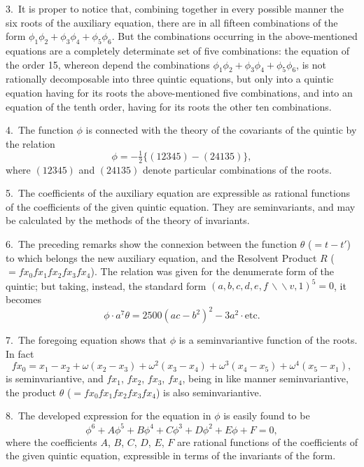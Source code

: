 \documentclass[11pt,a4paper]{article}
\theoremstyle{plain}
\theoremstyle{definition}
\theoremstyle{remark}
\begin{document}
\newpage
\setcounter{page}{322}

3.\ It is proper to notice that, combining together in every possible manner the six roots of the auxiliary equation, there are in all fifteen combinations of the form $\phi_1\phi_2+\phi_3\phi_4+\phi_5\phi_6$. But the combinations occurring in the above-mentioned equations are a completely determinate set of five combinations: the equation of the order 15, whereon depend the combinations $\phi_1\phi_2+\phi_3\phi_4+\phi_5\phi_6$, is not rationally decomposable into three quintic equations, but only into a quintic equation having for its roots the above-mentioned five combinations, and into an equation of the tenth order, having for its roots the other ten combinations.

4.\ The function $\phi$ is connected with the theory of the covariants of the quintic by the relation
\[
\phi = -\tfrac{1}{2}\{(12345)-(24135)\},
\]
where $(12345)$ and $(24135)$ denote particular combinations of the roots.

5.\ The coefficients of the auxiliary equation are expressible as rational functions of the coefficients of the given quintic equation. They are seminvariants, and may be calculated by the methods of the theory of invariants.

\newpage
\setcounter{page}{323}

6.\ The preceding remarks show the connexion between the function $\theta$ ($=t-t'$) to which belongs the new auxiliary equation, and the Resolvent Product $R$ ($=fx_0 fx_1 fx_2 fx_3 fx_4$). The relation was given for the denumerate form of the quintic; but taking, instead, the standard form $(a,b,c,d,e,f\,\backslash\!\!\backslash v, 1)^5=0$, it becomes
\[
\phi\cdot a^7\theta = 2500(ac-b^2)^2 - 3a^2\cdot\text{etc.}
\]

7.\ The foregoing equation shows that $\phi$ is a seminvariantive function of the roots. In fact
\[
fx_0 = x_1-x_2 + \omega(x_2-x_3) + \omega^2(x_3-x_4) + \omega^3(x_4-x_5) + \omega^4(x_5-x_1),
\]
is seminvariantive, and $fx_1$, $fx_2$, $fx_3$, $fx_4$, being in like manner seminvariantive, the product $\theta$ ($=fx_0 fx_1 fx_2 fx_3 fx_4$) is also seminvariantive.

\newpage
\setcounter{page}{324}

8.\ The developed expression for the equation in $\phi$ is easily found to be
\[
\phi^6 + A\phi^5 + B\phi^4 + C\phi^3 + D\phi^2 + E\phi + F = 0,
\]
where the coefficients $A$, $B$, $C$, $D$, $E$, $F$ are rational functions of the coefficients of the given quintic equation, expressible in terms of the invariants of the form.
\end{document}
